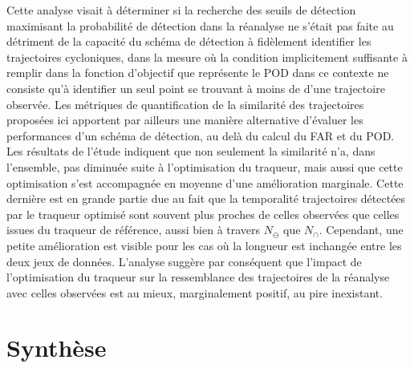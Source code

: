 \documentclass[../main.tex]{subfiles}
\begin{document}
Cette analyse visait à déterminer si la recherche des seuils de détection maximisant la probabilité de détection dans la réanalyse ne s'était pas faite au
détriment de la capacité du schéma de détection à fidèlement identifier les trajectoires cycloniques, dans la mesure où la condition implicitement suffisante à
remplir dans la fonction d'objectif que représente le POD dans ce contexte ne consiste qu'à identifier un seul point se trouvant à moins de  d'une
trajectoire observée. Les métriques de quantification de la similarité des trajectoires proposées ici apportent par ailleurs une manière alternative d'évaluer
les performances d'un schéma de détection, au delà du calcul du FAR et du POD. Les résultats de l'étude indiquent que non seulement la similarité n'a, dans
l'ensemble, pas diminuée suite à l'optimisation du traqueur, mais aussi que cette optimisation s'est accompagnée en moyenne d'une amélioration marginale. Cette
dernière est en grande partie due au fait que la temporalité trajectoires détectées par le traqueur optimisé sont souvent plus proches de celles observées que
celles issues du traqueur de référence, aussi bien à travers $N_\ominus$ que $N_\cap$. Cependant, une petite amélioration est visible pour les cas où la
longueur est inchangée entre les deux jeux de données. L'analyse suggère par conséquent que l'impact de l'optimisation du traqueur sur la ressemblance des
trajectoires de la réanalyse avec celles observées est au mieux, marginalement positif, au pire inexistant.

\section{Synthèse}
\end{document}
